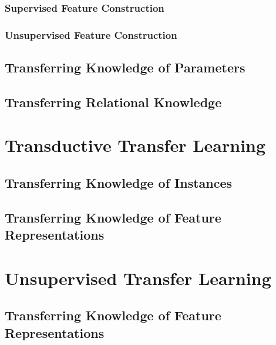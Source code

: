 \documentclass[a4paper,twocolumn]{article}
\begin{document}
\subsubsection{Supervised Feature Construction}
\subsubsection{Unsupervised Feature Construction}
\subsection{Transferring Knowledge of Parameters}
\subsection{Transferring Relational Knowledge}

\section{Transductive Transfer Learning}
\subsection{Transferring Knowledge of Instances}
\subsection{Transferring Knowledge of Feature Representations}

\section{Unsupervised Transfer Learning}
\subsection{Transferring Knowledge of Feature Representations}
\end{document}
